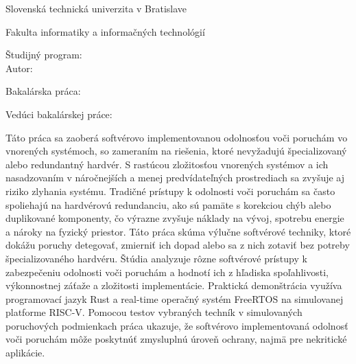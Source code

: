 \begin{minipage}[t]{1\columnwidth}%
Slovenská technická univerzita v Bratislave

Fakulta informatiky a informačných technológií

Študijný program: \myStudyProgram\\

Autor: \myName

Bakalárska práca: \myTitle

Vedúci bakalárskej práce: \mySupervisor

\myDate%
\end{minipage}

\bigskip{}

Táto práca sa zaoberá softvérovo implementovanou odolnosťou voči poruchám vo vnorených systémoch, so zameraním na riešenia, ktoré nevyžadujú špecializovaný alebo redundantný hardvér. S rastúcou zložitosťou vnorených systémov a ich nasadzovaním v náročnejších a menej predvídateľných prostrediach sa zvyšuje aj riziko zlyhania systému. Tradičné prístupy k odolnosti voči poruchám sa často spoliehajú na hardvérovú redundanciu, ako sú pamäte s korekciou chýb alebo duplikované komponenty, čo výrazne zvyšuje náklady na vývoj, spotrebu energie a nároky na fyzický priestor.
Táto práca skúma výlučne softvérové techniky, ktoré dokážu poruchy detegovať, zmierniť ich dopad alebo sa z nich zotaviť bez potreby špecializovaného hardvéru. Štúdia analyzuje rôzne softvérové prístupy k zabezpečeniu odolnosti voči poruchám a hodnotí ich z hľadiska spoľahlivosti, výkonnostnej záťaže a zložitosti implementácie. Praktická demonštrácia využíva programovací jazyk Rust a real-time operačný systém FreeRTOS na simulovanej platforme RISC-V. Pomocou testov vybraných techník v simulovaných poruchových podmienkach práca ukazuje, že softvérovo implementovaná odolnosť voči poruchám môže poskytnúť zmysluplnú úroveň ochrany, najmä pre nekritické aplikácie.

\clearpage


